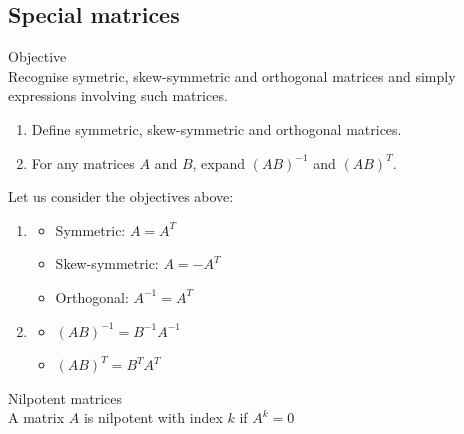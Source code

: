 \documentclass[journal, letterpaper]{IEEEtran}
\begin{document}
    \subsection{Special matrices}
    \begin{mybox}{Objective} \\ 
        Recognise symetric, skew-symmetric and orthogonal matrices and simply expressions involving such matrices.
        \begin{enumerate}
            \item Define symmetric, skew-symmetric and orthogonal matrices.
            \item For any matrices $A$ and $B$, expand $(AB)^{-1}$ and $(AB)^T$.
        \end{enumerate}
    \end{mybox}
    Let us consider the objectives above:
    \begin{enumerate}
        \item \begin{itemize}
            \item Symmetric: $A = A^T$
            \item Skew-symmetric: $A = -A^T$
            \item Orthogonal: $A^{-1} = A^T$
        \end{itemize}
        \item \begin{itemize}
            \item $(AB)^{-1} = B^{-1}A^{-1}$
            \item $(AB)^T = B^TA^T$
        \end{itemize}
    \end{enumerate}
    \begin{myboxr}{Nilpotent matrices} \\ 
        A matrix $A$ is nilpotent with index $k$ if 
        $A^k = 0$
    \end{myboxr}
\end{document}
